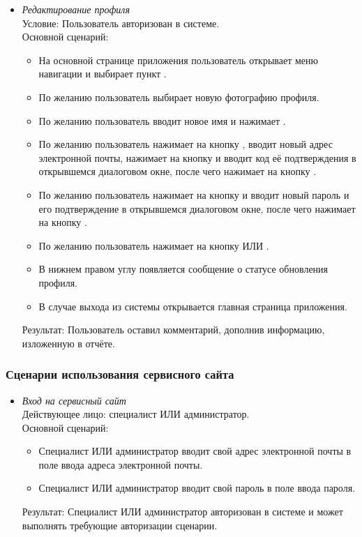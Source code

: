 \begin{itemize}[topsep=0pt, parsep=0pt, itemsep=0pt, leftmargin=*, labelindent=0.5cm]
	\item \textit{Редактирование профиля} \\
	Условие: Пользователь авторизован в системе. \\
	Основной сценарий:
	\begin{itemize}[topsep=0pt, parsep=0pt, itemsep=0pt, leftmargin=*, labelindent=0.5cm]
		\item На основной странице приложения пользователь открывает меню навигации и выбирает пункт .
		\item По желанию пользователь выбирает новую фотографию профиля.
		\item По желанию пользователь вводит новое имя и нажимает .
		\item По желанию пользователь нажимает на кнопку , вводит новый адрес электронной почты, нажимает на кнопку  и вводит код её подтверждения в открывшемся диалоговом окне, после чего нажимает на кнопку .
		\item По желанию пользователь нажимает на кнопку  и вводит новый пароль и его подтверждение в открывшемся диалоговом окне, после чего нажимает на кнопку .
		\item По желанию пользователь нажимает на кнопку  ИЛИ .
		\item В нижнем правом углу появляется сообщение о статусе обновления профиля.
		\item В случае выхода из системы открывается главная страница приложения.
	\end{itemize}
	Результат: Пользователь оставил комментарий, дополнив информацию, изложенную в отчёте.
\end{itemize}

\subsubsection{Сценарии использования сервисного сайта}

\begin{itemize}[topsep=0pt, parsep=0pt, itemsep=0pt, leftmargin=*, labelindent=0.5cm]
	\item \textit{Вход на сервисный сайт} \\
	Действующее лицо: специалист ИЛИ администратор. \\
	Основной сценарий:
	\begin{itemize}[topsep=0pt, parsep=0pt, itemsep=0pt, leftmargin=*, labelindent=0.5cm]
		\item Специалист ИЛИ администратор вводит свой адрес электронной почты в поле ввода адреса электронной почты.
		\item Специалист ИЛИ администратор вводит свой пароль в поле ввода пароля.
	\end{itemize}
	Результат: Специалист ИЛИ администратор авторизован в системе и может выполнять требующие авторизации сценарии.
\end{itemize}

